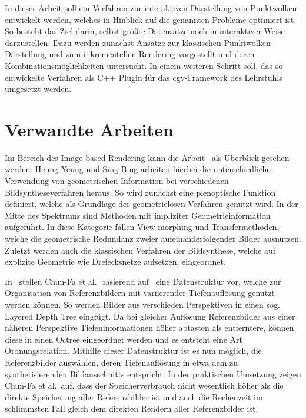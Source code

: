 \documentclass[hyperref, beleg, german]{cgvpub}
\begin{document}
In dieser Arbeit soll ein Verfahren zur interaktiven Darstellung von Punktwolken
entwickelt werden, welches in Hinblick auf die genannten Probleme optimiert ist.
So besteht das Ziel darin, selbst größte Datensätze noch in interaktiver Weise
darzustellen. Dazu werden zunächst Ansätze zur klassischen Punktwolken
Darstellung und zum inkrementellen Rendering vorgestellt und deren
Kombinationsmöglichkeiten untersucht. In einem weiteren Schritt soll, das so
entwickelte Verfahren als C++ Plugin für das cgv-Framework des Lehrstuhls
umgesetzt werden.

\chapter{Verwandte Arbeiten}%
\label{sec:verwandte_arbeiten}

Im Bereich des Image-based Rendering kann die Arbeit~\cite{shum2000review} als
Überblick gesehen werden. Heung-Yeung und Sing Bing arbeiten hierbei die
unterschiedliche Verwendung von geometrischen Information bei verschiedenen
Bildsyntheseverfahren heraus. So wird zunächst eine plenoptische Funktion
definiert, welche als Grundlage der geometrielosen Verfahren genutzt wird. In
der Mitte des Spektrums sind Methoden mit impliziter Geometrieinformation
aufgeführt. In diese Kategorie fallen View-morphing und Transfermethoden, welche
die geometrische Redundanz zweier aufeinanderfolgender Bilder ausnutzen. Zuletzt
werden auch die klassischen Verfahren der Bildsynthese, welche auf explizite
Geometrie wie Dreiecksnetze aufsetzen, eingeordnet.

In~\cite{chang1999ldi} stellen Chun-Fa et al.\ basierend auf~\cite{he1998layered}
eine Datenstruktur vor, welche zur Organisation von Referenzbildern mit
variierender Tiefenauflösung genutzt werden können. So werden Bilder aus
verschieden Perspektiven in einen sog. Layered Depth Tree eingfügt. Da bei
gleicher Auflösung Referenzbilder aus einer näheren Perspektive
Tiefeninformationen höher abtasten als entferntere, können diese in einen Octree
eingeordnet werden und es entsteht eine Art Ordnungsrelation. Mithilfe dieser
Datenstruktur ist es nun möglich, die Referenzbilder auswählen, deren
Tiefenauflösung in etwa dem zu synthetisierenden Bildausschnitts entspricht. In
der praktischen Umsetzung zeigen Chun-Fa et al.\ auf, dass der Speicherverbrauch
nicht wesentlich höher als die direkte Speicherung aller Referenzbilder ist und
auch die Rechenzeit im schlimmsten Fall gleich dem direkten Rendern aller
Referenzbilder ist.
\end{document}
